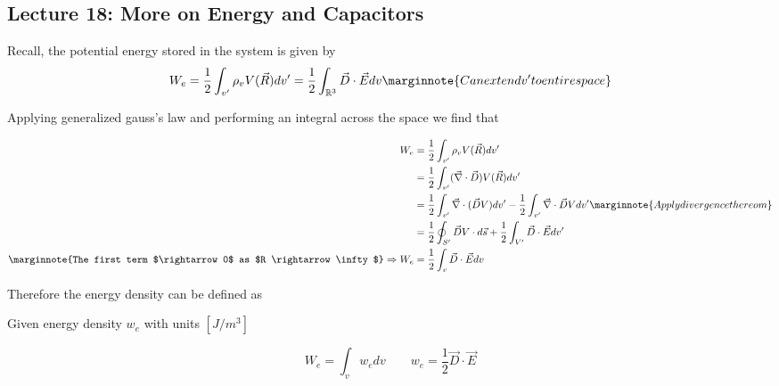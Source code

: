 \documentclass[10pt]{article}
\begin{document}
\subsection{Lecture 18: More on Energy and Capacitors}

\begin{remark}
	Recall, the potential energy stored in the system is given by
	\begin{equation}
		W_e = \frac{1}{2} \int_{v^\prime} \rho_v V(\vec{R}) dv^\prime = \frac{1}{2} \int_{\mathbb{R}^3} \vec{D} \cdot  \vec{E} dv
		\label{eq:259:electric_potential} \marginnote{Can extend v' to entire space}
	\end{equation}
	
\end{remark}

Applying generalized gauss's law and performing an integral across the space we find that





\begin{equation}
	\begin{split}
		W_e &= \frac{1}{2} \int_{v^\prime} \rho_v V(\vec{R}) dv^\prime \\
				&= \frac{1}{2} \int_{v^\prime} (\vec{\nabla } \cdot \vec{D}) V(\vec{R}) dv^\prime \\
				&= \frac{1}{2}\int_{v^\prime} \vec{\nabla } \cdot (\vec{D}V) dv^\prime  - \frac{1}{2}\int_{v^\prime} \vec{\nabla } \cdot \vec{D}V dv^\prime \marginnote{Apply divergence thereom} \\
				&= \frac{1}{2} \oint_{S^\prime} \vec{D}V \cdot  d\vec{s} + \frac{1}{2} \int_{V^\prime} \vec{D} \cdot \vec{E} dv^\prime \\
\marginnote{The first term $\rightarrow 0$ as $R \rightarrow \infty$}
		\Rightarrow W_e &= \frac{1}{2} \int_{v} \vec{D} \cdot \vec{E} dv \\
	\end{split}
	\label{eq:259:energy_wrt_field_quantities}
\end{equation}





Therefore the energy density can be defined as 

\begin{definition}
	Given energy density $ w_e $ with units $[J/m^3]$

	\begin{equation}
		W_e = \int_{v} w_e dv \qquad w_e = \frac{1}{2} \vec{D} \cdot \vec{E}
		\label{eq:259:energy_density}
	\end{equation}

\end{definition}
\end{document}
